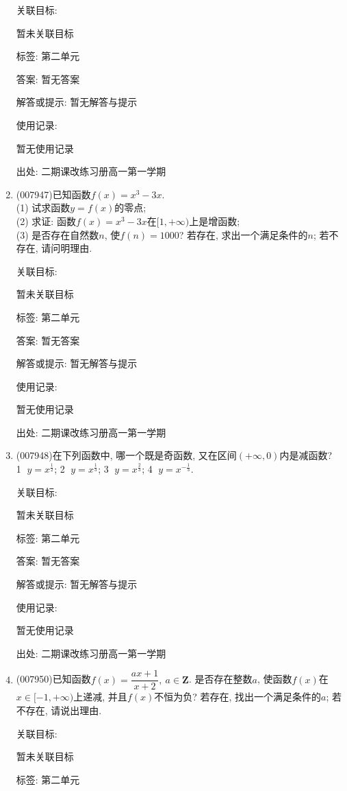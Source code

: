 \documentclass[10pt,a4paper]{article}
\begin{document}
\begin{enumerate}[1.]
关联目标:

暂未关联目标



标签: 第二单元

答案: 暂无答案

解答或提示: 暂无解答与提示

使用记录:

暂无使用记录


出处: 二期课改练习册高一第一学期
\item { (007947)}已知函数$f(x)=x^3-3x$.\\
(1) 试求函数$y=f(x)$的零点;\\
(2) 求证: 函数$f(x)=x^3-3x$在$[1,+\infty)$上是增函数;\\
(3) 是否存在自然数$n$, 使$f(n)=1000$? 若存在, 求出一个满足条件的$n$; 若不存在, 请问明理由.


关联目标:

暂未关联目标



标签: 第二单元

答案: 暂无答案

解答或提示: 暂无解答与提示

使用记录:

暂无使用记录


出处: 二期课改练习册高一第一学期
\item { (007948)}在下列函数中, 哪一个既是奇函数, 又在区间$(+\infty ,0)$内是减函数?\\ 
\textcircled{1} $y=x^{\frac 12}$; \textcircled{2} $y=x^{\frac 13}$; \textcircled{3} $y=x^{\frac 23}$; \textcircled{4} $y=x^{-\frac 13}$.


关联目标:

暂未关联目标



标签: 第二单元

答案: 暂无答案

解答或提示: 暂无解答与提示

使用记录:

暂无使用记录


出处: 二期课改练习册高一第一学期
\item { (007950)}已知函数$f(x)=\dfrac{ax+1}{x+2},\ a\in \mathbf{Z}$. 是否存在整数$a$, 使函数$f(x)$在$x\in [-1,+\infty)$上递减, 并且$f(x)$不恒为负? 若存在, 找出一个满足条件的$a$; 若不存在, 请说出理由.


关联目标:

暂未关联目标



标签: 第二单元


\end{enumerate}
\end{document}
